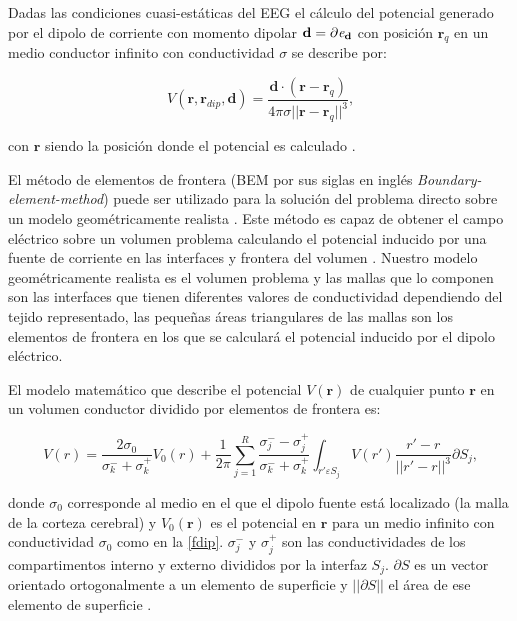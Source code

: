 Dadas las condiciones cuasi-estáticas del EEG \cite{Plonsey1967} el cálculo del potencial generado por el dipolo de corriente con momento dipolar $ \mathbf{d} = \partial\emph{e}_{\mathbf{d}}$ con posición $\mathbf{r}_{q}$ en un medio conductor infinito con conductividad $\sigma$ se describe por:

\begin{equation}
	\label{fdip}
	V(\mathbf{r},\mathbf{r}_{dip},\mathbf{d})=\frac{\mathbf{d}\cdot(\mathbf{r}-\mathbf{r}_{q})}{4\pi \sigma {||\mathbf{r}-\mathbf{r}_{q}||}^{3}}\text{,}
\end{equation}

con $\mathbf{r}$ siendo la posición donde el potencial es calculado \cite{Hallez2007}.

El método de elementos de frontera (BEM por sus siglas en inglés \emph{Boundary-element-method}) puede ser utilizado para la solución del problema directo sobre un modelo geométricamente realista \cite{Ermer2001}. Este método es capaz de obtener el campo eléctrico sobre un volumen problema calculando el potencial inducido por una fuente de corriente en las interfaces y frontera del volumen \cite{Hallez2007}. Nuestro modelo geométricamente realista es el volumen problema y las mallas que lo componen son las interfaces que tienen diferentes valores de conductividad dependiendo del tejido representado, las pequeñas áreas triangulares de las mallas son los elementos de frontera en los que se calculará el potencial inducido por el dipolo eléctrico.

El modelo matemático que describe el potencial $V(\mathbf{r})$ de cualquier punto $\mathbf{r}$ en un volumen conductor dividido por elementos de frontera es:

\begin{equation}
	\label{bem}
	V(r) = \frac{2\sigma_{0}}{\sigma_{k}^{-} + {\sigma_{k}^{+}}} V_{0}(r) + \frac{1}{2\pi} \sum_{j=1}^{R}\frac{\sigma_{j}^{-}-\sigma_{j}^{+}}{\sigma_{k}^{-}+\sigma_{k}^{+}} \int_{r'\varepsilon S_{j}} V(r') \frac{r'-r}{||r'-r||^3}\partial S_{j}\text{,}
\end{equation}

donde $\sigma_{0}$ corresponde al medio en el que el dipolo fuente está localizado (la malla de la corteza cerebral) y $V_{0}(\mathbf{r})$ es el potencial en $\mathbf{r}$ para un medio infinito con conductividad $\sigma_{0}$ como en la \cref{fdip}. $\sigma_{j}^{-}$ y $\sigma_{j}^{+}$ son las conductividades de los compartimentos interno y externo divididos por la interfaz $S_{j}$. $\partial S$ es un vector orientado ortogonalmente a un elemento de superficie y $||\partial S||$ el área de ese elemento de superficie \cite{Hallez2007}. 

